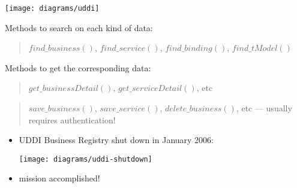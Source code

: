 \documentclass{sepslide-soa-faked} %
\begin{document}
\begin{slide}

	\texttt{[image: diagrams/uddi]}

\end{slide}

\begin{slide}

	Methods to search on each kind of data:
\begin{quote}	
	$find\_business()$, $find\_service()$, 
		$find\_binding()$, $find\_tModel()$
\end{quote}
	\bigskip

	Methods to get the corresponding data:
\begin{quote}
	$get\_businessDetail()$,
	$get\_serviceDetail()$,
	etc
\end{quote}
\end{slide}

\begin{slide}
\begin{quote}
	$save\_business()$, $save\_service()$,
	$delete\_business()$, etc
	--- usually requires authentication!
\end{quote}
\end{slide}

\begin{slide}
\begin{itemize}
\item UDDI Business Registry shut down in January 2006:
\begin{flushleft}
\texttt{[image: diagrams/uddi-shutdown]}
\end{flushleft}
\item mission accomplished!
\end{itemize}
\end{slide}
\end{document}
